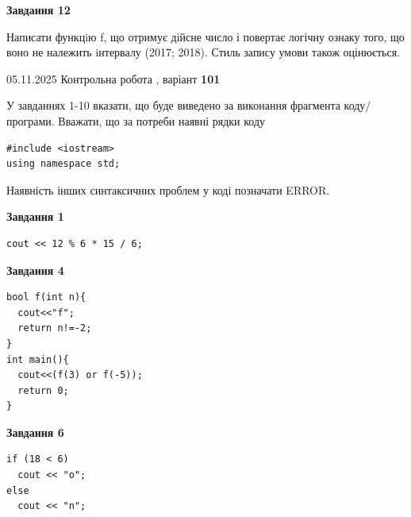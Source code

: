\documentclass[12pt, ukrainian]{article}
\begin{document}
{\begin {large}
\begin{minipage}[t]{11.0cm}
\begin{center}
\textbf{Завдання 12}
\end{center}

Написати функцiю f, що отримує дійсне число і повертає логічну ознаку того, що воно не належить iнтервалу (2017; 2018). Стиль запису умови також оцінюється.\par

\end{minipage}

\end {large}}
\newpage

{\Large{05.11.2025 Контрольна робота , варіант  \No \textbf { 101 }\par}}
{
\begin {large}
У завданнях 1-10 вказати, що буде виведено за виконання фрагмента коду/про\-гра\-ми.
Вважати, що за потреби наявні рядки коду
\begin{verbatim}
#include <iostream>
using namespace std;
\end{verbatim}
Наявність інших синтаксичних проблем у коді позначати ERROR.

\begin{minipage}[t]{7.0cm}

\begin{center}
\textbf{Завдання 1}
\end{center}
\vspace{-8mm}

\begin{verbatim}
cout << 12 % 6 * 15 / 6;
\end{verbatim}



\begin{center}
\textbf{Завдання 4}
\end{center}
\vspace{-8mm}

\begin{verbatim}
bool f(int n){
  cout<<"f";
  return n!=-2;
}
int main(){
  cout<<(f(3) or f(-5));
  return 0;
}
\end{verbatim}



\begin{center}
\textbf{Завдання 6}
\end{center}
\vspace{-8mm}

\begin{verbatim}
if (18 < 6)
  cout << "o";
else
  cout << "n";
\end{verbatim}




\end{minipage}
\end{large}}
\end{document}
